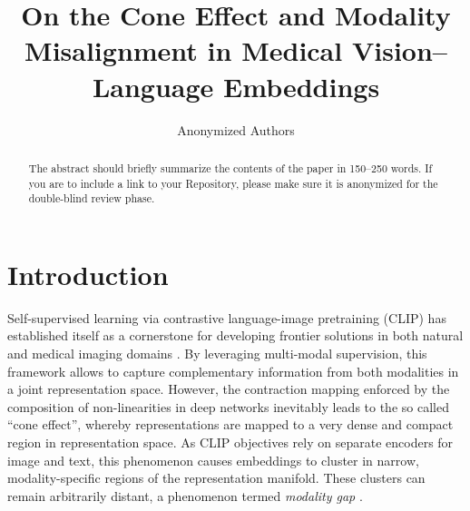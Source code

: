 \documentclass[runningheads]{llncs}
\begin{document}
%
\title{On the Cone Effect and Modality Misalignment in Medical Vision–Language Embeddings}
%

\author{Anonymized Authors}  %
  
\maketitle              %
%
\begin{abstract}
The abstract should briefly summarize the contents of the paper in 150--250 words.  If you are to include a link to your Repository, please make sure it is anonymized for the double-blind review phase.


\end{abstract}
%
%
%
\section{Introduction}
Self-supervised learning via contrastive language-image pretraining (CLIP) has established itself as a cornerstone for developing frontier solutions in both natural and medical imaging domains \cite{radford2021learning,zhang2022contrastive}. By leveraging multi-modal supervision, this framework allows to capture complementary information from both modalities in a joint representation space. However, the contraction mapping enforced by the composition of non-linearities in deep networks inevitably leads to the so called ``cone effect'', whereby representations are mapped to a very dense and compact region in representation space. As CLIP objectives rely on separate encoders for image and text, this phenomenon causes embeddings to cluster in narrow, modality-specific regions of the representation manifold. These clusters can remain arbitrarily distant, a phenomenon termed \emph{modality gap} \cite{liang2022mind}. 
\end{document}

